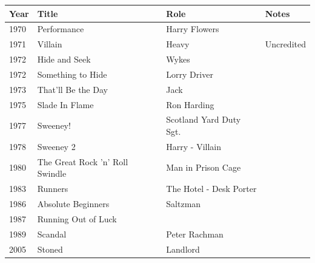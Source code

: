 \documentclass{article}
\begin{document}
\begin{tabular}{llll}
\toprule
Year & Title & Role & Notes \\
\midrule
1970 & Performance & Harry Flowers &  \\
1971 & Villain & Heavy & Uncredited \\
1972 & Hide and Seek & Wykes &  \\
1972 & Something to Hide & Lorry Driver &  \\
1973 & That'll Be the Day & Jack &  \\
1975 & Slade In Flame & Ron Harding &  \\
1977 & Sweeney! & Scotland Yard Duty Sgt. &  \\
1978 & Sweeney 2 & Harry - Villain &  \\
1980 & The Great Rock 'n' Roll Swindle & Man in Prison Cage &  \\
1983 & Runners & The Hotel - Desk Porter &  \\
1986 & Absolute Beginners & Saltzman &  \\
1987 & Running Out of Luck &  &  \\
1989 & Scandal & Peter Rachman &  \\
2005 & Stoned & Landlord &  \\
\bottomrule
\end{tabular}
\end{document}
